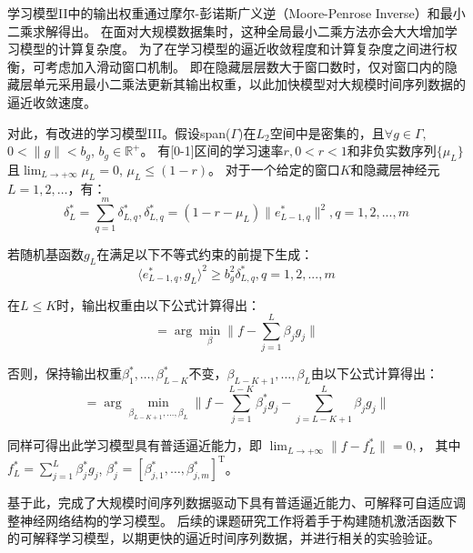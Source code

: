 学习模型II中的输出权重通过摩尔-彭诺斯广义逆（Moore-Penrose Inverse）和最小二乘求解得出。
在面对大规模数据集时，这种全局最小二乘方法亦会大大增加学习模型的计算复杂度。
为了在学习模型的逼近收敛程度和计算复杂度之间进行权衡，可考虑加入滑动窗口机制。
即在隐藏层层数大于窗口数时，仅对窗口内的隐藏层单元采用最小二乘法更新其输出权重，以此加快模型对大规模时间序列数据的逼近收敛速度。

对此，有改进的学习模型III。假设span($\Gamma$)在$L_2$空间中是密集的，且$\forall g\in \Gamma$, $0<\|g\|<b_g$, $b_g\in \mathbb{R}^{+}$。
有[0-1]区间的学习速率$r, 0<r<1$和非负实数序列$\{\mu_L\}$且$\lim_{L\rightarrow+\infty}\mu_L=0$, 
$\mu_L\leq (1-r)$。 对于一个给定的窗口$K$和隐藏层神经元$L=1,2,\ldots$，有：
\begin{equation}
    \delta_{L}^{*}=\sum_{q=1}^{m}\delta_{L,q}^{*}, \delta_{L,q}^{*}=(1-r-\mu_L)\|e_{L-1,q}^{*}\|^2, q=1,2,...,m
    \end{equation}

若随机基函数$g_L$在满足以下不等式约束的前提下生成：
    \begin{equation}\label{step3}
    \langle e_{L-1,q}^{*},g_L\rangle^2\geq b_g^2\delta_{L,q}^{*}, q=1,2,...,m
    \end{equation}

在$L\leq K$时，输出权重由以下公式计算得出：
\begin{equation}
    [\beta_1^{*}, \beta_2^{*},\ldots,\beta_{L}^{*}] = \arg \min_{\beta}\|f-\sum_{j=1}^{L}\beta_jg_j\| \label{step4}
\end{equation}

否则，保持输出权重$\beta_1^{*},\ldots,\beta_{L-K}^{*}$不变，$\beta_{L-K+1}, \ldots,\beta_{L}$由以下公式计算得出：
\begin{equation}
    [\beta_{L-K+1}^{*},\beta_{L-K+2}^{*},\ldots,\beta_{L}^{*}] = \arg \min_{\beta_{L-K+1}, \ldots,\beta_{L}}\|f-\sum_{j=1}^{L-K}\beta_j^{*}g_j-\sum_{j=L-K+1}^{L}\beta_jg_j\| \label{step7}
\end{equation}

同样可得出此学习模型具有普适逼近能力，即
$\lim_{L\rightarrow +\infty}\|f-f_L^{*}\|=0,$，
其中$f_L^{*}=\sum_{j=1}^{L}\beta_{j}^{*}g_j$, $\beta_{j}^{*}=[\beta^{*}_{j,1},\ldots,\beta^{*}_{j,m}]^{\mathrm{T}}$。

基于此，完成了大规模时间序列数据驱动下具有普适逼近能力、可解释可自适应调整神经网络结构的学习模型。
后续的课题研究工作将着手于构建随机激活函数下的可解释学习模型，以期更快的逼近时间序列数据，并进行相关的实验验证。